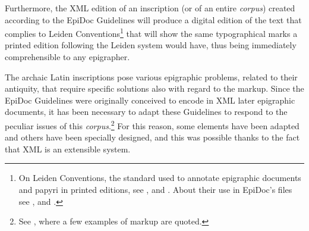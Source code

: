 \documentclass[amsthm,ebook]{saparticle}
\begin{document}
Furthermore, the XML edition of an inscription (or of an entire \emph{corpus}) created according to the EpiDoc Guidelines will
produce a digital edition of the text that complies to Leiden Conventions\footnote{On Leiden Conventions, the standard
used to annotate epigraphic documents and papyri in printed editions, see \citet{krummrey_criteri_1980}, \citet{panciera_segni_2006} and \citet{panciera_i_2006}. About their use in EpiDoc's files see \citet{elliot_conformance_2007}, \citet[229]{burnard_electronic_2006} and \citet[105]{bodard_epidoc:_2009}.} that will show the
same typographical marks a printed edition following the Leiden system would have, thus being immediately
comprehensible to any epigrapher.

The archaic Latin inscriptions pose various epigraphic problems, related to their antiquity, that require specific
solutions also with regard to the markup. Since the EpiDoc Guidelines were originally conceived to encode in XML later
epigraphic documents, it has been necessary to adapt these Guidelines to respond to the peculiar issues of this
\emph{corpus}.\footnote{See \citet[162-167]{sarullo_ledizione_2011}, where a few examples of markup are quoted. } For this reason, some elements
have been adapted and others have been specially designed, and this was possible thanks to the fact that XML is an
extensible system.
\end{document}
